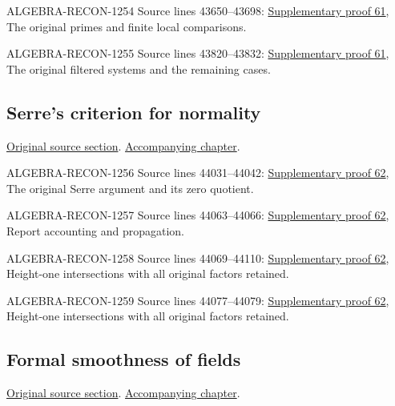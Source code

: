 \begin{AlgebraSourceRoutes}
\item[ALGEBRA-RECON-1254] Source lines 43650--43698: \hyperlink{algebra_quasifinite_henselization_notes_20260929}{Supplementary proof 61}, The original primes and finite local comparisons.
\item[ALGEBRA-RECON-1255] Source lines 43820--43832: \hyperlink{algebra_quasifinite_henselization_notes_20260929}{Supplementary proof 61}, The original filtered systems and the remaining cases.
\end{AlgebraSourceRoutes}

\subsection{Serre's criterion for normality}
\hypertarget{algebra-source-section-serre-criterion}{}
\noindent\href{https://github.com/stacks/stacks-project/blob/a04446e57ec1fbc252a871afcec7752fb2807b14/algebra.tex\#L43865}{Original source section}. \href{algebra.pdf\#nameddest=section-serre-criterion}{Accompanying chapter}.

\begin{AlgebraSourceRoutes}
\item[ALGEBRA-RECON-1256] Source lines 44031--44042: \hyperlink{algebra_serre_notes_20260929}{Supplementary proof 62}, The original Serre argument and its zero quotient.
\item[ALGEBRA-RECON-1257] Source lines 44063--44066: \hyperlink{algebra_serre_notes_20260929}{Supplementary proof 62}, Report accounting and propagation.
\item[ALGEBRA-RECON-1258] Source lines 44069--44110: \hyperlink{algebra_serre_notes_20260929}{Supplementary proof 62}, Height-one intersections with all original factors retained.
\item[ALGEBRA-RECON-1259] Source lines 44077--44079: \hyperlink{algebra_serre_notes_20260929}{Supplementary proof 62}, Height-one intersections with all original factors retained.
\end{AlgebraSourceRoutes}

\subsection{Formal smoothness of fields}
\hypertarget{algebra-source-section-p-bases}{}
\noindent\href{https://github.com/stacks/stacks-project/blob/a04446e57ec1fbc252a871afcec7752fb2807b14/algebra.tex\#L44127}{Original source section}. \href{algebra.pdf\#nameddest=section-p-bases}{Accompanying chapter}.

